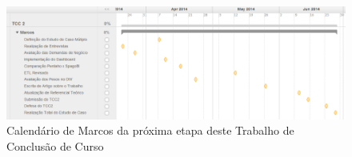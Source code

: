 \begin{figure}[ht!]
\centering
\includegraphics[bb=0 0 1257 350, scale=0.48]{figuras/tcc2-marcos.png}
\caption{Calendário de Marcos da próxima etapa deste Trabalho de Conclusão de Curso}
\label{calendar}
\end{figure}
\FloatBarrier
